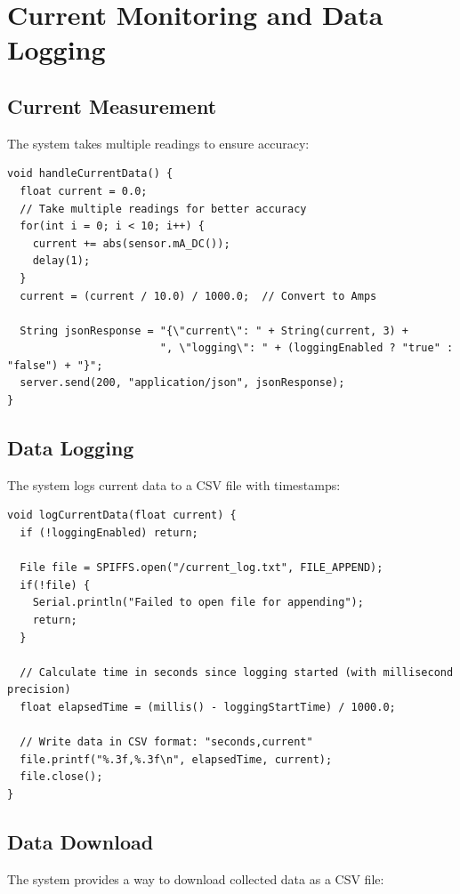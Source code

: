 \documentclass[12pt,a4paper]{report}
\begin{document}
\section{Current Monitoring and Data Logging}

\subsection{Current Measurement}
The system takes multiple readings to ensure accuracy:

\begin{verbatim}
void handleCurrentData() {
  float current = 0.0;
  // Take multiple readings for better accuracy
  for(int i = 0; i < 10; i++) {
    current += abs(sensor.mA_DC());
    delay(1);
  }
  current = (current / 10.0) / 1000.0;  // Convert to Amps
  
  String jsonResponse = "{\"current\": " + String(current, 3) + 
                        ", \"logging\": " + (loggingEnabled ? "true" : "false") + "}";
  server.send(200, "application/json", jsonResponse);
}
\end{verbatim}

\subsection{Data Logging}
The system logs current data to a CSV file with timestamps:

\begin{verbatim}
void logCurrentData(float current) {
  if (!loggingEnabled) return;
  
  File file = SPIFFS.open("/current_log.txt", FILE_APPEND);
  if(!file) {
    Serial.println("Failed to open file for appending");
    return;
  }
  
  // Calculate time in seconds since logging started (with millisecond precision)
  float elapsedTime = (millis() - loggingStartTime) / 1000.0;
  
  // Write data in CSV format: "seconds,current"
  file.printf("%.3f,%.3f\n", elapsedTime, current);
  file.close();
}
\end{verbatim}

\subsection{Data Download}
The system provides a way to download collected data as a CSV file:
\end{document}

